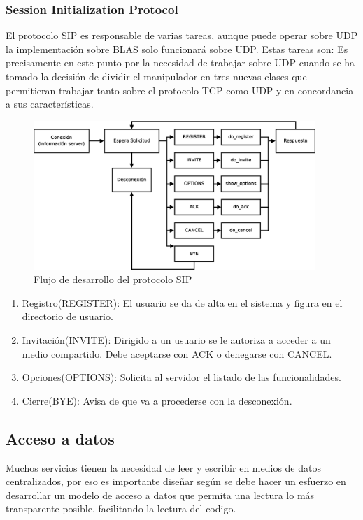 \documentclass[a4paper,spanish,12pt]{book}
\begin{document}
\subsubsection{Session Initialization Protocol}
El protocolo SIP es responsable de varias tareas, aunque puede operar sobre UDP la implementación sobre BLAS solo funcionará sobre UDP. Estas tareas son:
Es precisamente en este punto por la necesidad de trabajar sobre UDP cuando se ha tomado la decisión de dividir el manipulador en tres nuevas clases que permitieran trabajar tanto sobre el protocolo TCP como UDP y en concordancia a sus características.
\begin{figure}[h]
	\includegraphics[width=0.95\textwidth]{img/DiagramaFlujoSIP.eps}
              \caption{Flujo de desarrollo del protocolo SIP}
  \label{fig:DiagramaFlujoSIP}

\end{figure}

\begin{enumerate}
	\item{Registro(REGISTER): El usuario se da de alta en el sistema y figura en el directorio de usuario.}
	\item{Invitación(INVITE): Dirigido a un usuario se le autoriza a acceder a un medio compartido. Debe aceptarse con ACK o denegarse con CANCEL.}
	\item{Opciones(OPTIONS): Solicita al servidor el listado de las funcionalidades.}
	\item{Cierre(BYE): Avisa de que va a procederse con la desconexión.}
\end{enumerate}


\subsection{Acceso a datos}
Muchos servicios tienen la necesidad de leer y escribir en medios de datos centralizados, por eso es importante diseñar según se debe hacer un esfuerzo en desarrollar un modelo de acceso a datos que permita una lectura lo más transparente posible, facilitando la lectura del codigo. 
\end{document}
